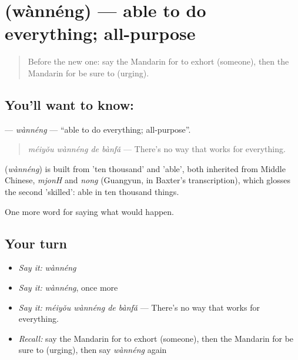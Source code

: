 \section[\texorpdfstring{\zh{万能} (wànnéng)}{万能 (wànnéng)}]{ (wànnéng) — able to do everything; all-purpose}

\label{lesson:ZH-C393-wanneng}



\begin{quote}
Before the new one: say the Mandarin for to exhort (someone), then the Mandarin for be sure to (urging).
\end{quote}

\subsection*{You'll want to know: }
\textbf{} — \emph{wànnéng} — \textquotedblleft{}able to do everything; all-purpose\textquotedblright{}.

\begin{quote}
\emph{méiyǒu wànnéng de bànfǎ} — There's no way that works for everything.
\end{quote}

\begin{cousinweb}
\textbf{} (\emph{wànnéng}) is built from  'ten thousand' and  'able', both inherited from Middle Chinese, \emph{mjonH} and \emph{nong} (Guangyun, in Baxter's transcription), which glosses the second 'skilled': able in ten thousand things.
\end{cousinweb}

\begin{grammarlens}[title={What you've built}]
One more word for saying what would happen.
\end{grammarlens}

\subsection*{Your turn}
\begin{itemize}
\raggedright
  \item \emph{Say it:} \emph{wànnéng}
  \item \emph{Say it:} \emph{wànnéng}, once more
  \item \emph{Say it:} \emph{méiyǒu wànnéng de bànfǎ} — There's no way that works for everything.
  \item \emph{Recall:} say the Mandarin for to exhort (someone), then the Mandarin for be sure to (urging), then say \emph{wànnéng} again
\end{itemize}

